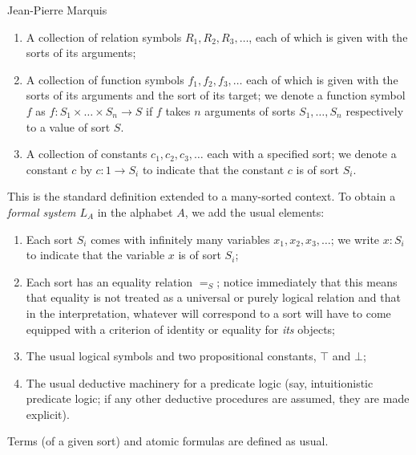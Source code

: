\begin{artengenv}{Jean-Pierre Marquis}
\begin{enumerate}
\item A collection of relation symbols \( R_1, R_2, R_3, \dots \), each of which is given with the sorts of its arguments;

\item A collection of function symbols \( f_1, f_2, f_3, \dots \) each of which is given with the sorts of its arguments and the sort of its target; we denote a function symbol \( f \) as \( f\colon S_1 \times \dots \times S_n \rightarrow S \) if \( f \) takes \( n \) arguments of sorts \( S_1, \dots, S_n \) 
respectively to a value of sort \( S \).

\item A collection of constants \( c_1, c_2, c_3, \dots \) each with a specified sort; we denote a constant \( c \) by \( c\colon 1 \rightarrow S_i \) to indicate that the constant \( c \) is of sort \( S_{i} \).
\end{enumerate}
%
This is the standard definition extended to a many-sorted context. To obtain a \textit{formal system \( L_{A} \)} in the alphabet \( A \), we add the usual elements:
%
\begin{enumerate}

\item Each sort \( S_i \) comes with infinitely many variables \( x_1, x_2, x_3, \dots \); we write \( x\colon S_i \) to indicate that the variable \( x \) is of sort \( S_i \);

\item Each sort has an equality relation \( =_{S} \); notice immediately that this means that equality is not treated as a universal or purely logical relation and that in the interpretation, 
whatever will correspond to a sort will have to come equipped with a criterion of identity or equality for \textit{its} objects;

\item The usual logical symbols and two propositional constants, \( \top \) and \( \bot \);

\item The usual deductive machinery for a predicate logic (say, intuitionistic predicate logic; if any other deductive procedures are assumed, they are made explicit).
\end{enumerate}
%
Terms (of a given sort) and atomic formulas are defined as usual. 



\end{artengenv}
